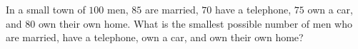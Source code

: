 In a small town of $100$ men, $85$ are married, $70$ have a telephone, $75$ own a car, and $80$ own their own home. What is the smallest possible number of men who are married, have a telephone, own a car, and own their own home?
